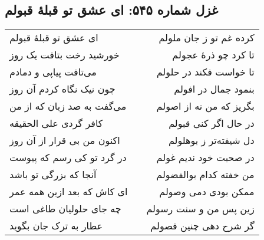 \begin{center}
\section*{غزل شماره ۵۴۵: ای عشق تو قبلهٔ قبولم}
\label{sec:545}
\begin{longtable}{l p{0.5cm} r}
ای عشق تو قبلهٔ قبولم
&&
کرده غم تو ز جان ملولم
\\
خورشید رخت بتافت یک روز
&&
تا کرد چو ذرهٔ عجولم
\\
می‌تافت پیاپی و دمادم
&&
تا خواست فکند در حلولم
\\
چون نیک نگاه کردم آن روز
&&
بنمود جمال در افولم
\\
می‌گفت به صد زبان که از من
&&
بگریز که من نه از اصولم
\\
کافر گردی علی الحقیقه
&&
در حال اگر کنی قبولم
\\
اکنون من بی قرار از آن روز
&&
دل شیفته‌تر ز بوهلولم
\\
در گرد تو کی رسم که پیوست
&&
در صحبت خود ندیم غولم
\\
آنجا که بزرگی تو باشد
&&
من خفته کدام بوالفضولم
\\
ای کاش که بعد ازین همه عمر
&&
ممکن بودی دمی وصولم
\\
چه جای حلولیان طاغی است
&&
زین پس من و سنت رسولم
\\
عطار به ترک جان بگوید
&&
گر شرح دهی چنین فصولم
\\
\end{longtable}
\end{center}
